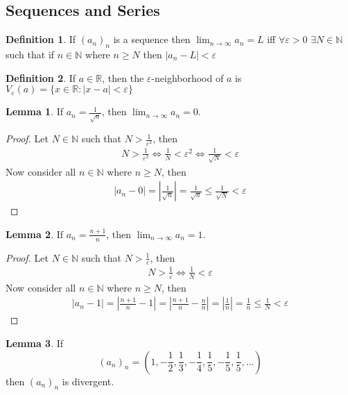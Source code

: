 \documentclass[12pt]{article}
\theoremstyle{definition}
\newtheorem{definition}{Definition}
\theoremstyle{definition}
\theoremstyle{definition}
\newtheorem{lemma}{Lemma}
\theoremstyle{definition}
\begin{document}
\begin{flushleft}

\section{Sequences and Series}
\begin{definition}
    If $(a_n)_n$ is a sequence then $\lim_{n\to \infty} a_n = L$ iff $\forall\varepsilon > 0$ $\exists N \in \mathbb{N}$ such that if $n \in \mathbb{N}$ where $n \geq N$ then $|a_n - L| < \varepsilon$
\end{definition}
\begin{definition}
    If $a \in \mathbb{R}$, then the $\varepsilon$-neighborhood of $a$ is $V_\varepsilon(a) = \{ x \in \mathbb{R} : |x - a| < \varepsilon \}$
\end{definition}
\begin{lemma}
    If $a_n = \frac{1}{\sqrt{n}}$, then $\lim_{n\to\infty} a_n = 0$.
\end{lemma}
\begin{proof}
    Let $N \in \mathbb{N}$ such that $N > \frac{1}{\varepsilon^2}$, then
    \begin{align*}
        N > \frac{1}{\varepsilon^2} \iff \frac{1}{N} < \varepsilon^2 \iff \frac{1}{\sqrt{N}} < \varepsilon
    \end{align*}
    Now consider all $n \in \mathbb{N}$ where $n \geq N$, then
    \begin{align*}
        |a_n - 0| = \left|\frac{1}{\sqrt{n}}\right| = \frac{1}{\sqrt{n}} \leq \frac{1}{\sqrt{N}} < \varepsilon
    \end{align*}
\end{proof}
\begin{lemma}
    If $a_n = \frac{n + 1}{n}$, then $\lim_{n\to\infty} a_n = 1$.
\end{lemma}
\begin{proof}
    Let $N \in \mathbb{N}$ such that $N > \frac{1}{\varepsilon}$, then
    \begin{align*}
        N > \frac{1}{\varepsilon} \iff \frac{1}{N} < \varepsilon
    \end{align*}
    Now consider all $n \in \mathbb{N}$ where $n \geq N$, then
    \begin{align*}
        |a_n - 1|
        = \left|\frac{n + 1}{n} - 1\right|
        = \left|\frac{n + 1}{n} - \frac{n}{n}\right|
        = \left|\frac{1}{n}\right|
        = \frac{1}{n}
        \leq \frac{1}{N}
        < \varepsilon
    \end{align*}
\end{proof}
\begin{lemma}
    If \[
        (a_n)_n = \left(1, -\frac{1}{2}, \frac{1}{3}, -\frac{1}{4}, \frac{1}{5}, -\frac{1}{5}, \frac{1}{5}, \ldots\right)
    \]
    then $(a_n)_n$ is divergent.
\end{lemma}

\end{flushleft}
\end{document}
